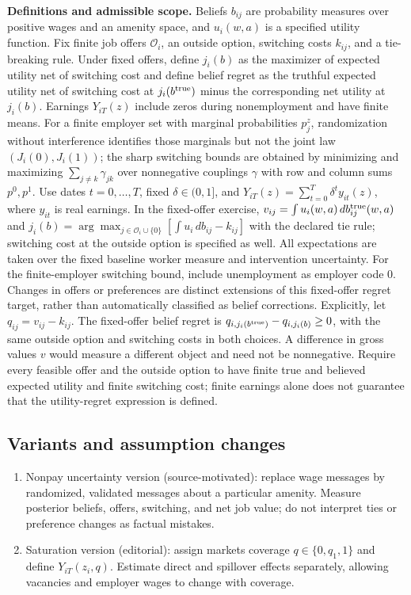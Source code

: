 \documentclass[11pt,a4paper]{article}
\begin{document}
\textbf{Definitions and admissible scope.} Beliefs \(b_{ij}\) are probability measures over positive wages and an amenity space, and \(u_i(w,a)\) is a specified utility function. Fix finite job offers \(\mathcal O_i\), an outside option, switching costs \(k_{ij}\), and a tie-breaking rule. Under fixed offers, define \(j_i(b)\) as the maximizer of expected utility net of switching cost and define belief regret as the truthful expected utility net of switching cost at \(j_i(b^{\rm true})\) minus the corresponding net utility at \(j_i(b)\). Earnings \(Y_{iT}(z)\) include zeros during nonemployment and have finite means. For a finite employer set with marginal probabilities \(p_j^z\), randomization without interference identifies those marginals but not the joint law \((J_i(0),J_i(1))\); the sharp switching bounds are obtained by minimizing and maximizing \(\sum_{j\ne k}\gamma_{jk}\) over nonnegative couplings \(\gamma\) with row and column sums \(p^0,p^1\). Use dates \(t=0,\ldots,T\), fixed \(\delta\in(0,1]\), and \(Y_{iT}(z)=\sum_{t=0}^T\delta^t y_{it}(z)\), where \(y_{it}\) is real earnings. In the fixed-offer exercise, \(v_{ij}=\int u_i(w,a)\,db_{ij}^{\rm true}(w,a)\) and \(j_i(b)=\arg\max_{j\in\mathcal O_i\cup\{0\}}[\int u_i\,db_{ij}-k_{ij}]\) with the declared tie rule; switching cost at the outside option is specified as well. All expectations are taken over the fixed baseline worker measure and intervention uncertainty. For the finite-employer switching bound, include unemployment as employer code 0. Changes in offers or preferences are distinct extensions of this fixed-offer regret target, rather than automatically classified as belief corrections. Explicitly, let \(q_{ij}=v_{ij}-k_{ij}\). The fixed-offer belief regret is \(q_{i,j_i(b^{\rm true})}-q_{i,j_i(b)}\ge0\), with the same outside option and switching costs in both choices. A difference in gross values \(v\) would measure a different object and need not be nonnegative. Require every feasible offer and the outside option to have finite true and believed expected utility and finite switching cost; finite earnings alone does not guarantee that the utility-regret expression is defined.
\subsection*{Variants and assumption changes}
\begin{enumerate}
\item Nonpay uncertainty version (source-motivated): replace wage messages by randomized, validated messages about a particular amenity. Measure posterior beliefs, offers, switching, and net job value; do not interpret ties or preference changes as factual mistakes.
\item Saturation version (editorial): assign markets coverage \(q\in\{0,q_1,1\}\) and define \(Y_{iT}(z_i,q)\). Estimate direct and spillover effects separately, allowing vacancies and employer wages to change with coverage.
\end{enumerate}
\end{document}
